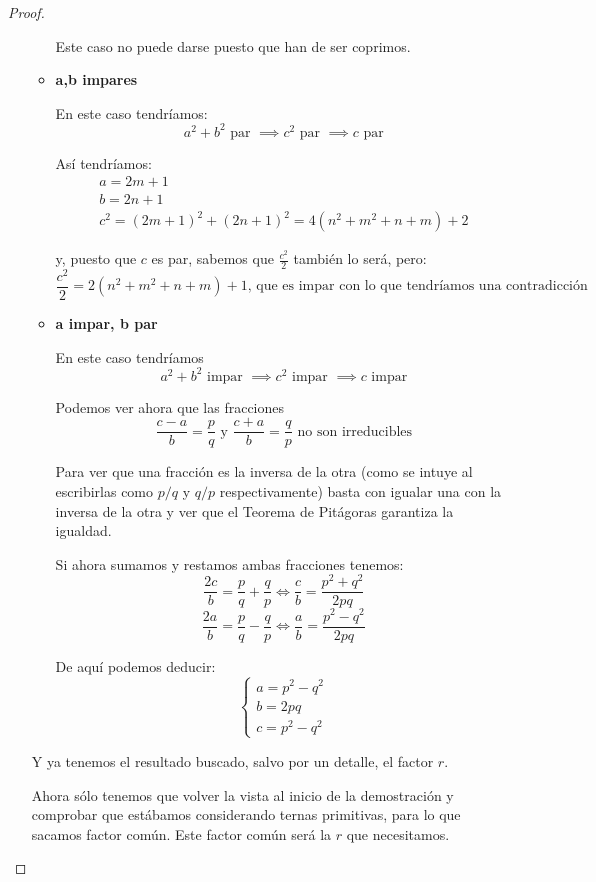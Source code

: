 \documentclass{apuntes}
\begin{document}
\begin{proof}
\begin{enumerate}
\begin{itemize}
Este caso no puede darse puesto que han de ser coprimos.

\item \textbf{a,b impares}

En este caso tendríamos:
\[a^2+b^2 \text{ par } \implies c^2 \text{ par } \implies c \text{ par}\]

Así tendríamos:
\[\begin{array}{l} a=2m+1 \\ b = 2n+1 \\ c^2 =(2m+1)^2+(2n+1)^2 = 4(n^2+m^2+n+m)+2\end{array} \]

y, puesto que $c$ es par, sabemos que $\frac{c^2}{2}$ también lo será, pero:
\[\frac{c^2}{2} = 2(n^2+m^2+n+m)+1 \text{, que es impar con lo que tendríamos una contradicción}\]

\item \textbf{a impar, b par}

En este caso tendríamos
\[a^2+b^2 \text{ impar } \implies c^2 \text{ impar } \implies c \text{ impar}\]

Podemos ver ahora que las fracciones 
\[\frac{c-a}{b}=\frac{p}{q} \text{ y } \frac{c+a}{b}=\frac{q}{p} \text{ no son irreducibles}\]

\obs Para ver que una fracción es la inversa de la otra (como se intuye al escribirlas como $p/q$ y $q/p$ respectivamente) basta con igualar una con la inversa de la otra y ver que el Teorema de Pitágoras garantiza la igualdad.

Si ahora sumamos y restamos ambas fracciones tenemos:
\[\frac{2c}{b}=\frac{p}{q}+\frac{q}{p} \iff \frac{c}{b}=\frac{p^2+q^2}{2pq}\]
\[\frac{2a}{b}=\frac{p}{q}-\frac{q}{p} \iff \frac{a}{b}=\frac{p^2-q^2}{2pq}\]

De aquí podemos deducir:
\[\left\{ \begin{array}{l} a=p^2-q^2 \\ b=2pq \\ c=p^2-q^2 \end{array} \right.\]

\end{itemize}
Y ya tenemos el resultado buscado, salvo por un detalle, el factor $r$. 

Ahora sólo tenemos que volver la vista al inicio de la demostración y comprobar que estábamos considerando ternas primitivas, para lo que sacamos factor común. Este factor común será la $r$ que necesitamos.
\end{enumerate}
\end{proof}
\end{document}
